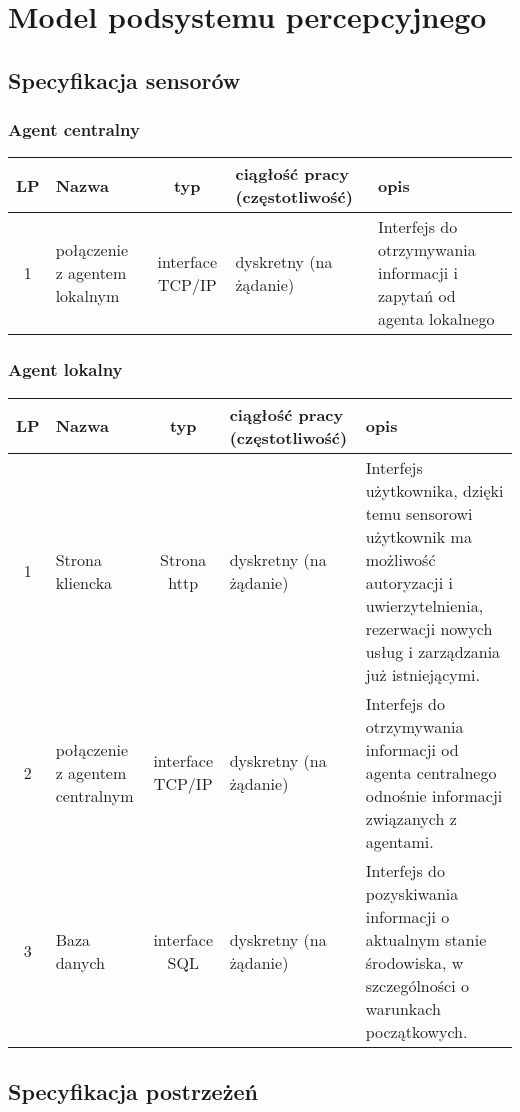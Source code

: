 \section{Model podsystemu percepcyjnego}
\subsection{Specyfikacja sensorów}
\subsubsection{Agent centralny}

\begin{tabular}{c|p{3cm}|c|p{2cm}|p{4cm}}
LP		& Nazwa			& typ			& ciągłość pracy (częstotliwość)	& opis\\
\hline
1 		& połączenie z agentem lokalnym		& interface TCP/IP	& dyskretny (na żądanie) & Interfejs do otrzymywania informacji i zapytań od agenta lokalnego \\
\end{tabular}

\subsubsection{Agent lokalny}

\begin{tabular}{c|p{3cm}|c|p{2cm}|p{4cm}}
LP		& Nazwa			& typ			& ciągłość pracy (częstotliwość) & opis \\
\hline
1 		& Strona kliencka		& Strona http	& dyskretny (na żądanie) & Interfejs użytkownika, dzięki temu sensorowi użytkownik ma możliwość autoryzacji i uwierzytelnienia, rezerwacji nowych usług i zarządzania już istniejącymi. \\
2 		& połączenie z agentem centralnym		& interface TCP/IP & dyskretny (na żądanie) 	& Interfejs do otrzymywania informacji od agenta centralnego odnośnie informacji związanych z agentami. \\
3		& Baza danych		& interface SQL	& dyskretny (na żądanie) & Interfejs do pozyskiwania informacji o aktualnym stanie środowiska, w szczególności o warunkach początkowych.\\
\end{tabular}



\subsection{Specyfikacja postrzeżeń}

